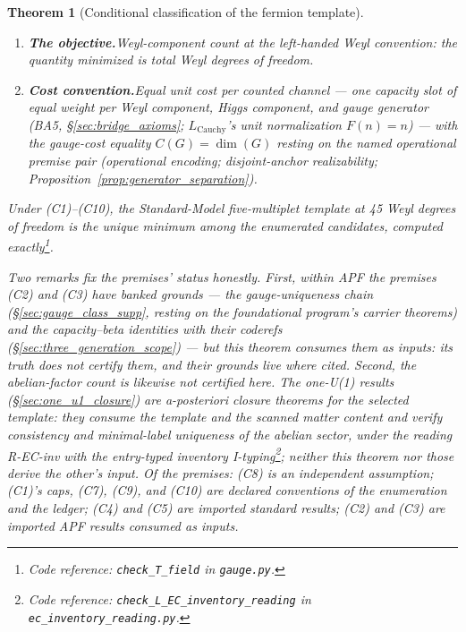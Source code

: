 \documentclass[11pt]{article}
\newtheorem{theorem}{Theorem}[section]
\theoremstyle{definition}
\newcommand{\coderef}[2]{\footnote{Code reference: \texttt{#1} in \texttt{#2}.}}
\begin{document}
\begin{theorem}[Conditional classification of the fermion template]
\begin{enumerate}[label=(C\arabic*),nosep]
  independent phenomenological assumption --- nonzero quark-doublet
  hypercharge on the complete anomaly system --- declared at its point
  of use (\S\ref{sec:seven_filters}), where its honest typing is
  stated (the retired name ``electromagnetic completeness'' overstated
  it); without it the argmin moves to the 42-DOF stripped generation.
  F6 and EC-label-injectivity are logically independent --- computed,
  in both directions\coderef{check\_L\_F6\_not\_from\_EC}{ec\_inventory\_reading.py}.
  \item \textbf{The objective.}\quad Weyl-component count at the
  left-handed Weyl convention: the quantity minimized is total Weyl
  degrees of freedom.
  \item \textbf{Cost convention.}\quad Equal unit cost per counted
  channel --- one capacity slot of equal weight per Weyl component,
  Higgs component, and gauge generator (BA5,
  \S\ref{sec:bridge_axioms}; $L_{\mathrm{Cauchy}}$'s unit
  normalization $F(n)=n$) --- with the gauge-cost equality
  $C(G) = \dim(G)$ resting on the named operational premise pair
  (operational encoding; disjoint-anchor realizability;
  Proposition~\ref{prop:generator_separation}).
\end{enumerate}
Under (C1)--(C10), the Standard-Model five-multiplet template at 45
Weyl degrees of freedom is the unique minimum among the enumerated
candidates, computed
exactly\coderef{check\_T\_field}{gauge.py}.

Two remarks fix the premises' status honestly.  First, within APF the
premises (C2) and (C3) have banked grounds --- the gauge-uniqueness
chain (\S\ref{sec:gauge_class_supp}, resting on the foundational
program's carrier theorems) and the capacity--beta identities with
their coderefs (\S\ref{sec:three_generation_scope}) --- but this
theorem consumes them as \emph{inputs}: its truth does not certify
them, and their grounds live where cited.  Second, the abelian-factor
count is likewise not certified here.  The one-U(1) results
(\S\ref{sec:one_u1_closure}) are a-posteriori closure theorems for
the selected template: they consume the template and the scanned
matter content and verify consistency and minimal-label uniqueness of
the abelian sector, under the reading R-EC-inv with the entry-typed
inventory
I-typing\coderef{check\_L\_EC\_inventory\_reading}{ec\_inventory\_reading.py};
neither this theorem nor those derive the other's input.  Of the
premises: (C8) is an independent assumption; (C1)'s caps, (C7), (C9),
and (C10) are declared conventions of the enumeration and the ledger;
(C4) and (C5) are imported standard results; (C2) and (C3) are
imported APF results consumed as inputs.
\end{theorem}
\end{document}
